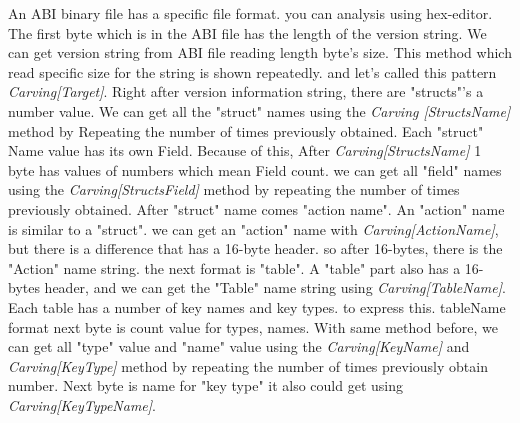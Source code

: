 An ABI binary file has a specific file format. you can analysis using hex-editor. 
The first byte which is in the ABI file has the length of the version string. We can get version string from ABI file reading length byte's size. This method which read specific size for the string is shown repeatedly. and let's called this pattern  \textit{Carving[Target]}. Right after version information string, there are "structs"'s a number value. We can get all the "struct" names using the \textit {Carving [StructsName]} method by Repeating the number of times previously obtained.
Each "struct" Name value has its own Field.
Because of this, After \textit{Carving[StructsName]} 1 byte has values of numbers which mean Field count. we can get all "field" names using the \textit{Carving[StructsField]} method by repeating the number of times previously obtained. 
After "struct" name comes "action name". 
An "action" name is similar to a "struct". we can get an "action" name with \textit{Carving[ActionName]}, but there is a difference that has a 16-byte header. so after 16-bytes, there is the "Action" name string.
the next format is "table".
A "table" part also has a 16-bytes header, and we can get the "Table" name string using \textit{Carving[TableName]}.
Each table has a number of key names and key types. to express this. tableName format next byte is count value for types, names. With same method before, we can get all "type" value and "name" value using the \textit{Carving[KeyName]} and \textit{Carving[KeyType]} method by repeating the number of times previously obtain number. Next byte is name for "key type" it also could get using \textit{Carving[KeyTypeName]}.




